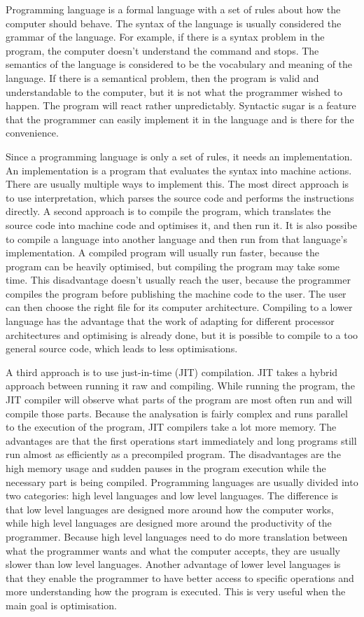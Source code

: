 Programming language is a formal language with a set of rules about how the computer should behave. The syntax of the language is usually considered the grammar of the language. For example, if there is a syntax problem in the program, the computer doesn't understand the command and stops. The semantics of the language is considered to be the vocabulary and meaning of the language. If there is a semantical problem, then the program is valid and understandable to the computer, but it is not what the programmer wished to happen. The program will react rather unpredictably. Syntactic sugar is a feature that the programmer can easily implement it in the language and is there for the convenience.

Since a programming language is only a set of rules, it needs an implementation. An implementation is a program that evaluates the syntax into machine actions. There are usually multiple ways to implement this. The most direct approach is to use interpretation, which parses the source code and performs the instructions directly. A second approach is to compile the program, which translates the source code into machine code and optimises it, and then run it. It is also possibe to compile a language into another language and then run from that language's implementation. A compiled program will usually run faster, because the program can be heavily optimised, but compiling the program may take some time. This disadvantage doesn't usually reach the user, because the programmer compiles the program before  publishing the machine code to the user. The user can then choose the right file for its computer architecture. Compiling to a lower language has the advantage that the work of adapting for different processor architectures and optimising is already done, but it is possible to compile to a too general source code, which leads to less optimisations.

A third approach is to use just-in-time (JIT) compilation. JIT takes a hybrid
approach between running it raw and compiling. While running the program, the
JIT compiler will observe what parts of the program are most often run and will
compile those parts. Because the analysation is fairly complex and runs parallel
to the execution of the program, JIT compilers take a lot more
memory.\cite{jit-memory} The advantages are that the first operations start
immediately and long programs still run almost as efficiently as a precompiled program. The disadvantages are the high memory usage and sudden pauses in the program execution while the necessary part is being compiled.
Programming languages are usually divided into two categories: high level languages and low level languages. The difference is that low level languages are designed more around how the computer works, while high level languages are designed more around the productivity of the programmer. Because high level languages need to do more translation between what the programmer wants and what the computer accepts, they are usually slower than low level languages. Another advantage of lower level languages is that they enable the programmer to have better access to specific operations and more understanding how the program is executed. This is very useful when the main goal is optimisation.

